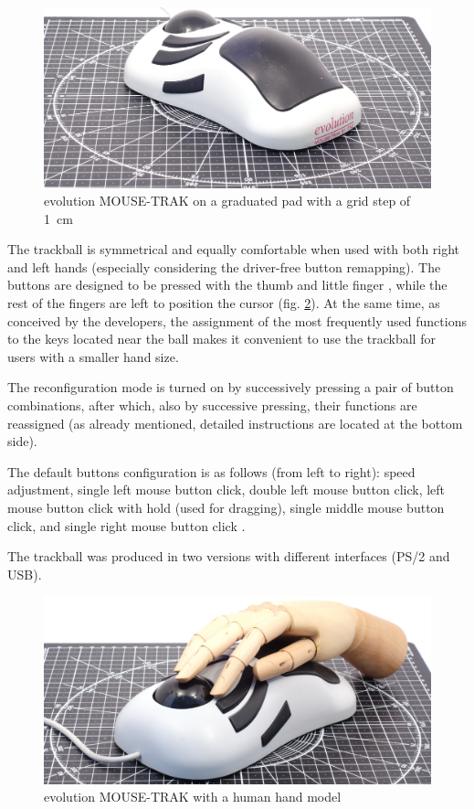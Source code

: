 \documentclass[11pt, a4paper]{article}
\begin{document}
\begin{figure}[h]
    \centering
    \includegraphics[scale=0.35]{1997_mousetrak_evolution/size_30.jpg}
    \caption{evolution MOUSE-TRAK on a graduated pad with a grid step of 1~cm}
    \label{fig:evolutionMOUSE-TRAKSize}
\end{figure}

The trackball is symmetrical and equally comfortable when used with both right and left hands (especially considering the driver-free button remapping).
The buttons are designed to be pressed with the thumb and little finger \cite{pcmag}, while the rest of the fingers are left to position the cursor (fig. \ref{fig:evolutionMOUSE-TRAKHand}). At the same time, as conceived by the developers, the assignment of the most frequently used functions to the keys located near the ball makes it convenient to use the trackball for users with a smaller hand size.

The reconfiguration mode is turned on by successively pressing a pair of button combinations, after which, also by successive pressing, their functions are reassigned (as already mentioned, detailed instructions are located at the bottom side).

The default buttons configuration is as follows (from left to right): speed adjustment, single left mouse button click, double left mouse button click, left mouse button click with hold (used for dragging), single middle mouse button click, and single right mouse button click \cite{advanced}.

The trackball was produced in two versions with different interfaces (PS/2 and USB).

\begin{figure}[h]
    \centering
    \includegraphics[scale=0.35]{1997_mousetrak_evolution/hand_30.jpg}
    \caption{evolution MOUSE-TRAK with a human hand model}
    \label{fig:evolutionMOUSE-TRAKHand}
\end{figure}
\end{document}
